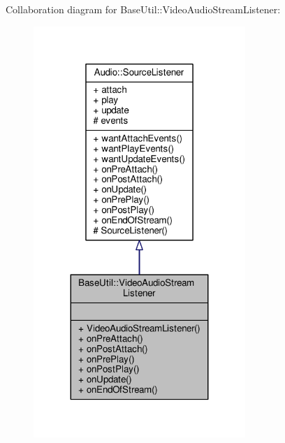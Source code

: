 Collaboration diagram for Base\+Util\+:\+:Video\+Audio\+Stream\+Listener\+:
\nopagebreak
\begin{figure}[H]
\begin{center}
\leavevmode
\includegraphics[width=227pt]{d8/d97/classBaseUtil_1_1VideoAudioStreamListener__coll__graph}
\end{center}
\end{figure}
